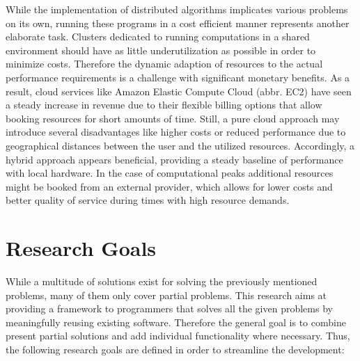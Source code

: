 While the implementation of distributed algorithms implicates various problems on its own, running these programs in a cost efficient manner represents another elaborate task. Clusters dedicated to running computations in a shared environment should have as little underutilization as possible in order to minimize costs. Therefore the dynamic adaption of resources to the actual performance requirements is a challenge with significant monetary benefits. As a result, cloud services like Amazon Elastic Compute Cloud (abbr. EC2) have seen a steady increase in revenue due to their flexible billing options that allow booking resources for short amounts of time\cite{gartner_2017}. Still, a pure cloud approach may introduce several disadvantages like higher costs or reduced performance due to geographical distances between the user and the utilized resources. Accordingly, a hybrid approach appears beneficial, providing a steady baseline of performance with local hardware. In the case of computational peaks additional resources might be booked from an external provider, which allows for lower costs and better quality of service during times with high resource demands.

\section*{Research Goals}
\label{goals}
While a multitude of solutions exist for solving the previously mentioned problems, many of them only cover partial problems. This research aims at providing a framework to programmers that solves all the given problems by meaningfully reusing existing software. Therefore the general goal is to combine present partial solutions and add individual functionality where necessary. Thus, the following research goals are defined in order to streamline the development:

